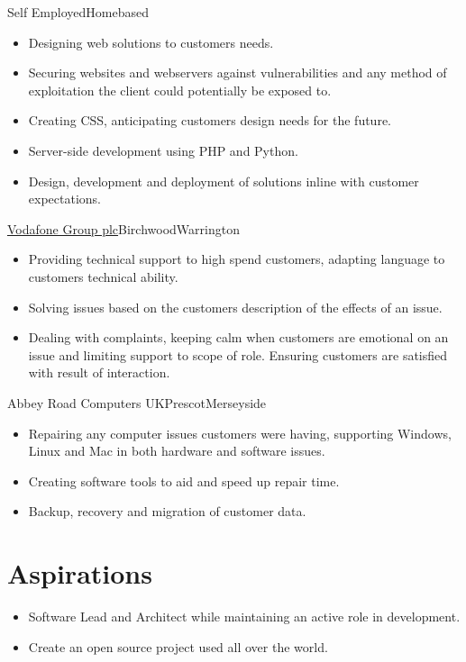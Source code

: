 \documentclass[a4paper,10pt]{moderncv}
\newcommand\weblink[2] {{\color{href} \href{#1}{#2}}}
\begin{document}
{Self Employed}{Homebased}{}{
\begin{itemize}
  \item Designing web solutions to customers needs.
  \item Securing websites and webservers against vulnerabilities and any method of exploitation the client could potentially be exposed to.
  \item Creating CSS, anticipating customers design needs for the future.
  \item Server-side development using PHP and Python.
  \item Design, development and deployment of solutions inline with customer expectations.
\end{itemize}
}

{\weblink{http://www.vodafone.com/}{Vodafone Group plc}}{Birchwood}{Warrington}{
\begin{itemize}
  \item Providing technical support to high spend customers, adapting language to customers technical ability.
  \item Solving issues based on the customers description of the effects of an issue.
  \item Dealing with complaints, keeping calm when customers are emotional on an issue and limiting support to scope of role. Ensuring customers are satisfied with result of interaction.
\end{itemize}
}

{Abbey Road Computers UK}{Prescot}{Merseyside}{
\begin{itemize}
  \item Repairing any computer issues customers were having, supporting Windows, Linux and Mac in both hardware and software issues.
  \item Creating software tools to aid and speed up repair time.
  \item Backup, recovery and migration of customer data.
\end{itemize}
}

\section{Aspirations}
\begin{itemize}
\item Software Lead and Architect while maintaining an active role in development.
\item Create an open source project used all over the world.
\end{itemize}
\end{document}
